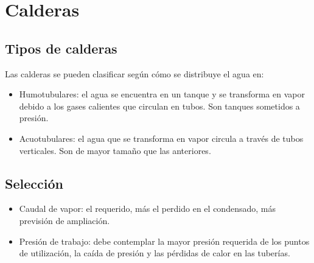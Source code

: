 \section{Calderas}

\subsection{Tipos de calderas}
Las calderas se pueden clasificar según cómo se distribuye el agua en:
\begin{itemize}
    \item Humotubulares: el agua se encuentra en un tanque y se transforma en vapor debido a los gases calientes que circulan en tubos. Son tanques sometidos a presión.
    \item Acuotubulares: el agua que se transforma en vapor circula a través de tubos verticales. Son de mayor tamaño que las anteriores.
\end{itemize}

\subsection{Selección}

\begin{itemize}
    \item Caudal de vapor: el requerido, más el perdido en el condensado, más previsión de ampliación.
    \item Presión de trabajo: debe contemplar la mayor presión requerida de los puntos de utilización, la caída de presión y las pérdidas de calor en las tuberías.
\end{itemize}
